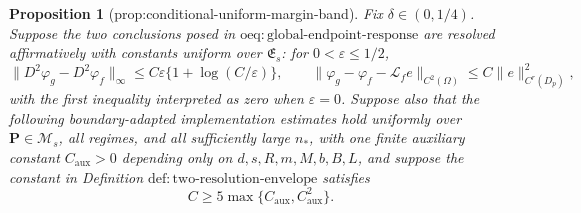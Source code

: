 \documentclass{article}
\newtheorem{proposition}{Proposition}
\begin{document}
\begin{proposition}[prop:conditional-uniform-margin-band]\label{prop:conditional-uniform-margin-band}
Fix \(\delta\in(0,1/4)\).  Suppose the two conclusions posed in \(\mathrm{oeq:global\text{-}endpoint\text{-}response}\) are resolved affirmatively with constants uniform over \(\mathfrak E_s\): for \(0<\varepsilon\le1/2\),
\[
 \lVert D^2\varphi_g-D^2\varphi_f\rVert_\infty
 \le C\varepsilon\{1+\log(C/\varepsilon)\},
 \qquad
 \lVert\varphi_g-\varphi_f-\mathscr L_fe\rVert_{C^2(\Omega)}
 \le C\lVert e\rVert_{C^r(D_p)}^2,
 \tag{A}
\]
with the first inequality interpreted as zero when \(\varepsilon=0\).  Suppose also that the following boundary-adapted implementation estimates hold uniformly over \(\mathbf P\in\mathcal M_s\), all regimes, and all sufficiently large \(n_\ast\), with one finite auxiliary constant \(C_{\mathrm{aux}}>0\) depending only on \(d,s,R,m,M,b,B,L\), and suppose the constant in Definition \(\mathrm{def:two\text{-}resolution\text{-}envelope}\) satisfies
\[
 C\ge5\max\{C_{\mathrm{aux}},C_{\mathrm{aux}}^2\}.
 \tag{C}
\]


\end{proposition}
\end{document}
